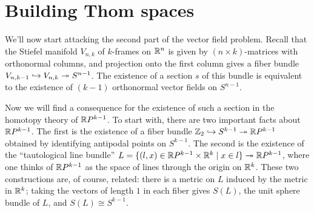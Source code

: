 
\section{Building Thom spaces} %
\label{BuildingThomSpaces}
\ifx\OutputBuildingThomSpaces\undefined\else
We'll now start attacking the second part of the vector field problem.  Recall that the Stiefel manifold $V_{n, k}$ of $k$-frames on $\mathbb{R}^n$ is given by $(n \times k)$-matrices with orthonormal columns, and projection onto the first column gives a fiber bundle $V_{n, k-1} \hookrightarrow V_{n, k} \twoheadrightarrow S^{n-1}$.  The existence of a section $s$ of this bundle is equivalent to the existence of $(k-1)$ orthonormal vector fields on $S^{n-1}$.

Now we will find a consequence for the existence of such a section in the homotopy theory of $\mathbb{R} P^{k-1}$.  To start with, there are two important facts about $\mathbb{R} P^{k-1}$.  The first is the existence of a fiber bundle $\mathbb{Z}_2 \hookrightarrow S^{k-1} \twoheadrightarrow \mathbb{R} P^{k-1}$ obtained by identifying antipodal points on $S^{k-1}$.  The second is the existence of the ``tautological line bundle'' $L = \{(l, x) \in \mathbb{R} P^{k-1} \times \mathbb{R}^k \mid x \in l\} \twoheadrightarrow \mathbb{R} P^{k-1}$, where one thinks of $\mathbb{R} P^{k-1}$ as the space of lines through the origin on $\mathbb{R}^k$.  These two constructions are, of course, related: there is a metric on $L$ induced by the metric in $\mathbb{R}^k$; taking the vectors of length $1$ in each fiber gives $S(L)$, the unit sphere bundle of $L$, and $S(L) \cong S^{k-1}$.

